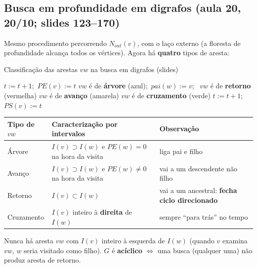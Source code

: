 \subsection{Busca em profundidade em digrafos (aula 20, 20/10; slides 123--170)}\label{sec:dfsdig}
Mesmo procedimento percorrendo $N_{out}(v)$, com o laço externo (a floresta de profundidade alcança todos os vértices). Agora há \textbf{quatro} tipos de aresta:
\begin{pseudo}{Classificação das arestas $vw$ na busca em digrafos (slides)}
\begin{algorithmic}
  \State $t:=t+1$;\ $PE(v):=t$
     \State $vw$ é de \textbf{árvore} (azul);\ $pai(w):=v$;\ 
     \State $vw$ é de \textbf{retorno} (vermelha) 
     \State $vw$ é de \textbf{avanço} (amarela) 
    \Else \State $vw$ é de \textbf{cruzamento} (verde) 
    \EndIf
  \EndFor
  \State $t:=t+1$;\ $PS(v):=t$
\EndProcedure
\end{algorithmic}
\end{pseudo}
\begin{center}\small
\begin{tabular}{@{}lll@{}}
\toprule
Tipo de $vw$ & Caracterização por intervalos & Observação\\
\midrule
Árvore & $I(v)\supset I(w)$ e $PE(w)=0$ na hora da visita & liga pai e filho\\
Avanço & $I(v)\supset I(w)$ e $PE(w)\ne0$ na hora da visita & vai a um descendente não filho\\
Retorno & $I(v)\subset I(w)$ & vai a um ancestral: \textbf{fecha ciclo direcionado}\\
Cruzamento & $I(v)$ inteiro à \textbf{direita} de $I(w)$ & sempre ``para trás'' no tempo\\
\bottomrule
\end{tabular}
\end{center}
Nunca há aresta $vw$ com $I(v)$ inteiro à esquerda de $I(w)$ (quando $v$ examina $vw$, $w$ seria visitado como filho). $G$ é \textbf{acíclico} $\iff$ uma busca (qualquer uma) não produz aresta de retorno.

